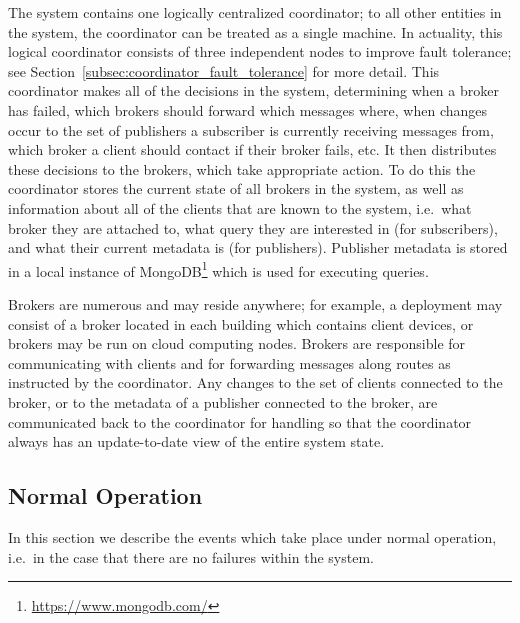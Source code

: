 The system contains one logically centralized coordinator; to all other entities in the system, the coordinator can be treated as a single machine.
In actuality, this logical coordinator consists of three independent nodes to improve fault tolerance; see Section~\ref{subsec:coordinator_fault_tolerance} for more detail.
This coordinator makes all of the decisions in the system, determining when a broker has failed, which brokers should forward which messages where, when changes occur to the set of publishers a subscriber is currently receiving messages from, which broker a client should contact if their broker fails, etc.
It then distributes these decisions to the brokers, which take appropriate action.
To do this the coordinator stores the current state of all brokers in the system, as well as information about all of the clients that are known to the system, i.e.\ what broker they are attached to, what query they are interested in (for subscribers), and what their current metadata is (for publishers).
Publisher metadata is stored in a local instance of MongoDB\footnote{\url{https://www.mongodb.com/}} which is used for executing queries.

Brokers are numerous and may reside anywhere; for example, a deployment may consist of a broker located in each building which contains client devices, or brokers may be run on cloud computing nodes.
Brokers are responsible for communicating with clients and for forwarding messages along routes as instructed by the coordinator.
Any changes to the set of clients connected to the broker, or to the metadata of a publisher connected to the broker, are communicated back to the coordinator for handling so that the coordinator always has an update-to-date view of the entire system state.

\subsection{Normal Operation}
\label{subsec:normal_operation}

In this section we describe the events which take place under normal operation, i.e.\ in the case that there are no failures within the system.

